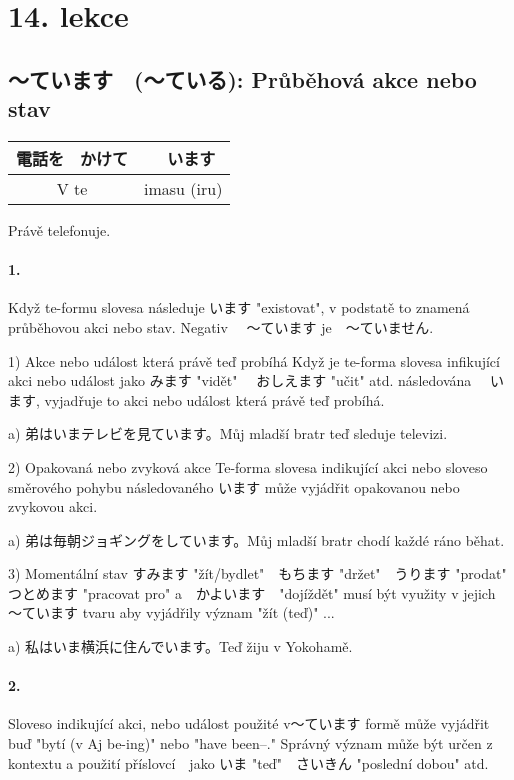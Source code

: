 \section{14. lekce}
\label{sec:lekce_14}

\subsection{〜ています　(〜ている): Průběhová akce nebo stav}
\begin{center}
\begin{tabular}{|c|c|}
\hline
電話を　かけて&　います\\
\hline
V te&imasu (iru)\\
\hline
\end{tabular}
\end{center}
Právě telefonuje.

\paragraph{1.} Když te-formu slovesa následuje います "existovat", v podstatě to znamená průběhovou akci nebo stav. Negativ 　〜ています je　〜ていません. 

1) Akce nebo událost která právě teď probíhá
Když je te-forma slovesa infikující akci nebo událost jako みます "vidět" 　おしえます "učit" atd.  následována 　います, vyjadřuje to akci nebo událost která právě teď probíhá.

a) 弟はいまテレビを見ています。Můj mladší bratr teď sleduje televizi.

2) Opakovaná nebo zvyková akce
Te-forma slovesa indikující akci nebo sloveso směrového pohybu následovaného います může vyjádřit opakovanou nebo zvykovou akci.

a) 弟は毎朝ジョギングをしています。Můj mladší bratr chodí každé ráno běhat.

3) Momentální stav 
すみます "žít/bydlet"　もちます "držet"　うります "prodat"　つとめます "pracovat pro" a　かよいます　"dojíždět" musí být využity v jejich 〜ています tvaru aby vyjádřily význam "žít (teď)" ...

a) 私はいま横浜に住んでいます。Teď žiju v Yokohamě.




\paragraph{2.} Sloveso indikující akci, nebo událost použité v〜ています formě může vyjádřit buď "bytí (v Aj be-ing)" nebo "have been--." Správný význam může být určen z kontextu a použití příslovcí　jako いま "teď"　さいきん "poslední dobou" atd.

